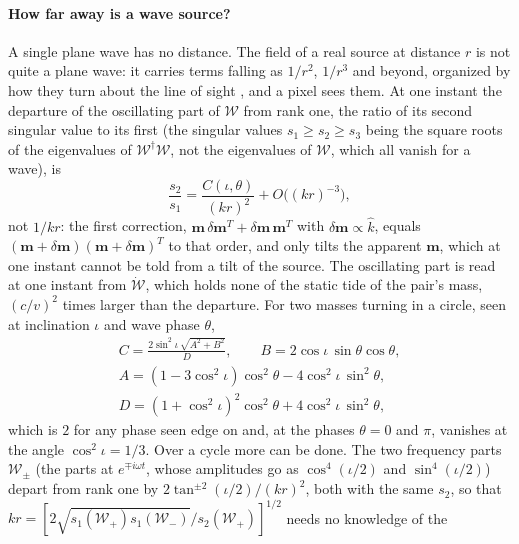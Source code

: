 \paragraph{How far away is a wave source?} A single plane wave has no distance.
The field of a real source at distance $r$ is not quite a plane wave: it carries
terms falling as $1/r^2$, $1/r^3$ and beyond, organized by how they turn about
the line of sight \cite{Sachs1962}, and a pixel sees them. At one instant the
departure of the oscillating part of $\mathcal{W}$ from rank one, the ratio of its
second singular value to its first (the singular values $s_1 \ge s_2 \ge s_3$
being the square roots of the eigenvalues of $\mathcal W^\dagger\mathcal W$, not
the eigenvalues of $\mathcal W$, which all vanish for a wave), is
\begin{equation}\label{eq:ranging-instant}
\frac{s_2}{s_1} = \frac{C(\iota, \theta)}{(kr)^2} + O\bigl((kr)^{-3}\bigr),
\end{equation}
not $1/kr$: the first correction, $\mathbf m\,\delta\mathbf m^T + \delta\mathbf m\,\mathbf m^T$
with $\delta\mathbf m \propto \hat k$, equals $(\mathbf m + \delta\mathbf m)(\mathbf m +
\delta\mathbf m)^T$ to that order, and only tilts the apparent $\mathbf{m}$, which at one
instant cannot be told from a tilt of the source. The oscillating part is read
at one instant from $\dot{\mathcal W}$, which holds none of the static tide of the
pair's mass, $(c/v)^2$ times larger than the departure. For two masses turning in a
circle, seen at inclination $\iota$ and wave phase $\theta$,
\begin{equation}\label{eq:ranging-C}
\begin{gathered}
C = \frac{2\sin^2\!\iota\,\sqrt{A^2 + B^2}}{D}, \qquad
B = 2\cos\iota\,\sin\theta\cos\theta,\\
A = (1 - 3\cos^2\!\iota)\cos^2\!\theta - 4\cos^2\!\iota\,\sin^2\!\theta,\\
D = (1 + \cos^2\!\iota)^2\cos^2\!\theta + 4\cos^2\!\iota\,\sin^2\!\theta,
\end{gathered}
\end{equation}
which is $2$ for any phase seen edge on and, at the phases $\theta = 0$ and
$\pi$, vanishes at the angle $\cos^2\iota = 1/3$. Over a cycle more can be done. The two frequency parts
$\mathcal{W}_\pm$ (the parts at $e^{\mp i\omega t}$, whose amplitudes go as
$\cos^4(\iota/2)$ and $\sin^4(\iota/2)$) depart from rank one by
$2\tan^{\pm2}(\iota/2)/(kr)^2$, both with the same $s_2$, so that
$kr = [2\sqrt{s_1(\mathcal{W}_+)s_1(\mathcal{W}_-)}/s_2(\mathcal{W}_+)]^{1/2}$ needs no knowledge of the
